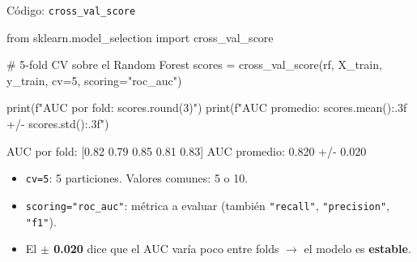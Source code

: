 \documentclass[aspectratio=169, 11pt]{beamer}
\begin{document}
\begin{frame}[fragile,shrink=18]{Código: \texttt{cross\_val\_score}}
  \vspace{-6pt}
  \begin{pyblock}
from sklearn.model_selection import cross_val_score

# 5-fold CV sobre el Random Forest
scores = cross_val_score(rf, X_train, y_train,
                         cv=5, scoring="roc_auc")

print(f"AUC por fold: {scores.round(3)}")
print(f"AUC promedio: {scores.mean():.3f} +/- {scores.std():.3f}")
  \end{pyblock}

  \vspace{4pt}
  \begin{outputblock}
AUC por fold: [0.82  0.79  0.85  0.81  0.83]
AUC promedio: 0.820 +/- 0.020
  \end{outputblock}

  \vspace{4pt}
  {\scriptsize\color{arcaDark}
  \begin{itemize}\setlength{\itemsep}{3pt}
    \item[{\color{arcaRed}\scriptsize\faArrowRight}]
      \texttt{cv=5}: 5 particiones. Valores comunes: 5 o 10.
    \item[{\color{arcaRed}\scriptsize\faArrowRight}]
      \texttt{scoring="roc\_auc"}: métrica a evaluar (también
      \texttt{"recall"}, \texttt{"precision"}, \texttt{"f1"}).
    \item[{\color{arcaRed}\scriptsize\faArrowRight}]
      El \textbf{$\pm$ 0.020} dice que el AUC varía poco entre folds
      $\to$ el modelo es \textbf{estable}.
  \end{itemize}
  }
\end{frame}
\end{document}
